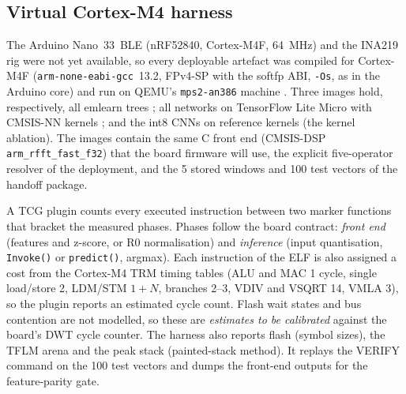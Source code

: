 \documentclass[conference]{IEEEtran}
\begin{document}
\begin{table}[t]
\centering
\caption{Design matrix (\NumConfigs{} model IDs; R4 rows added after the first sweep).}
\label{tab:sweep}
\setlength{\tabcolsep}{3pt}
\end{table}

\subsection{Virtual Cortex-M4 harness}
\label{sec:vmcu}
The Arduino Nano~33~BLE (nRF52840, Cortex-M4F, \SI{64}{MHz}) and the INA219 rig were not yet available, so every
deployable artefact was compiled for Cortex-M4F (\texttt{arm-none-eabi-gcc}~13.2, FPv4-SP with the softfp ABI, \texttt{-Os}, as in the
Arduino core) and run on QEMU's \texttt{mps2-an386} machine \cite{bellard2005qemu}. Three images hold, respectively, all emlearn trees \cite{nordby2019emlearn}; all
networks on TensorFlow Lite Micro \cite{david2021tflm} with CMSIS-NN kernels \cite{lai2018cmsisnn}; and the int8 CNNs
on reference kernels (the kernel ablation).
The images contain the same C front end (CMSIS-DSP \texttt{arm\_rfft\_fast\_f32}) that the board firmware will use,
the explicit five-operator resolver of the deployment, and the 5 stored windows and 100 test vectors of the handoff
package.

A TCG plugin counts every executed instruction between two marker functions that bracket the measured phases. Phases
follow the board contract: \emph{front end} (features and z-score, or R0 normalisation) and \emph{inference} (input
quantisation, \texttt{Invoke()} or \texttt{predict()}, argmax). Each instruction of the ELF is also assigned a cost
from the Cortex-M4 TRM timing tables \cite{arm2010m4trm} (ALU and MAC 1 cycle, single load/store 2, LDM/STM $1+N$, branches 2--3, VDIV and
VSQRT 14, VMLA 3), so the plugin reports an estimated cycle count. Flash wait states and bus contention are not
modelled, so these are \emph{estimates to be calibrated} against the board's DWT cycle counter. The harness also
reports flash (symbol sizes), the TFLM arena and the peak stack (painted-stack method). It replays the VERIFY command
on the 100 test vectors and dumps the front-end outputs for the feature-parity gate.
\end{document}
